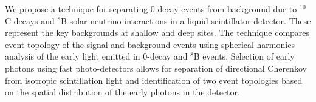 We propose a technique for separating 0{\nbb}-decay events from
background due to $^{10}$C decays and $^8$B solar neutrino
interactions in a liquid scintillator detector. These represent the
key backgrounds at shallow and deep sites. The technique compares
event topology of the signal and background events using spherical
harmonics analysis of the early light emitted in 0{\nbb}-decay and
$^8$B events. Selection of early photons using fast photo-detectors
allows for separation of directional Cherenkov from isotropic
scintillation light and identification of two event topologies based
on the spatial distribution of the early photons in the detector.
